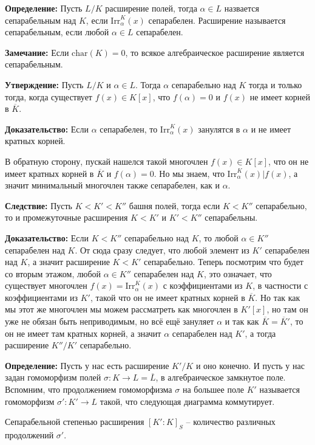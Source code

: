 \documentclass[a4paper, 12pt]{book}
\begin{document}
\textbf{Определение:} Пусть $L/K$ расширение полей, тогда $\alpha\in L$ назвается
сепарабельным над $K$, если $\text{Irr}_\alpha^K(x)$ сепарабелен. Расширение
называется сепарабельным, если любой $\alpha\in L$ сепарабелен.

\textbf{Замечание:} Если $\text{char}(K)=0$, то всякое алгебраическое расширение
является сепарабельным.

\textbf{Утверждение:} Пусть $L/K$ и $\alpha\in L$. Тогда $\alpha$ сепарабельно
над $K$ тогда и только тогда, когда существует $f(x)\in K[x]$, что $f(\alpha)=0$
и $f(x)$ не имеет корней в $\overline{K}$.

\textbf{Доказательство:} Если $\alpha$ сепарабелен, то $\text{Irr}_\alpha^K(x)$
занулятся в $\alpha$ и не имеет кратных корней.

В обратную сторону, пускай нашелся такой многочлен $f(x)\in K[x]$, что он не
имеет кратных корней в $\overline K$ и $f(\alpha)=0$. Но мы знаем, что
$\text{Irr}_\alpha^K(x)|f(x)$, а значит минимальный многочлен также сепарабелен,
как и $\alpha$.

\textbf{Следствие:} Пусть $K<K'<K''$ башня полей, тогда если $K<K''$
сепарабельно, то и промежуточные расширения $K<K'$ и $K'<K''$ сепарабельны.

\textbf{Доказательство:} Если $K<K''$ сепарабельно над $K$, то любой $\alpha\in
K''$ сепарабелен над $K$. От сюда сразу следует, что любой элемент из $K'$
сепарабелен над $K$, а значит расширение $K<K'$ сепарабельно. Теперь посмотрим
что будет со вторым этажом, любой $\alpha\in K''$ сепарабелен над $K$, это
означает, что существует многочлен $f(x)=\text{Irr}_\alpha^K(x)$ с коэффициентами из $K$, в частности
с коэффициентами из $K'$, такой что он не имеет кратных корней в $\overline{K}$.
Но так как мы этот же многочлен мы можем рассматреть как многочлен в $K'[x]$,
но там он уже не обязан быть неприводимым, но всё ещё зануляет $\alpha$ и
так как $\overline K = \overline K'$, то он не имеет там кратных корней, а значит
$\alpha$ сепарабелен над $K'$, а тогда расширение $K''/K'$ сепарабельно.

\textbf{Определение:} Пусть у нас есть расширение $K'/K$ и оно конечно. И пусть
у нас задан гомоморфизм полей $\sigma:K\rightarrow L=\overline L$, в
алгебраическое замкнутое поле. Вспомним, что продолжением гомоморфизма $\sigma$
на большее поле $K'$ называется гомоморфизм $\sigma':K'\rightarrow L$ такой,
что следующая диаграмма коммутирует.
\begin{center}
\end{center}
Сепарабельной степенью расширения $[K':K]_S$ – количество различных продолжений
$\sigma'$.
\end{document}
